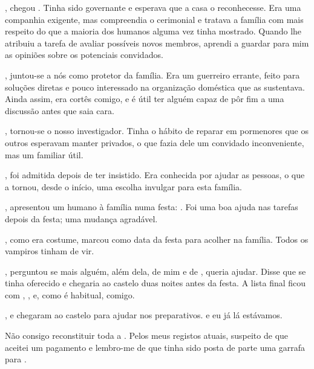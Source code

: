 {, chegou . Tinha sido governante e esperava que a casa o reconhecesse. Era uma companhia exigente, mas compreendia o cerimonial e tratava a família com mais respeito do que a maioria dos humanos alguma vez tinha mostrado. Quando  lhe atribuiu a tarefa de avaliar possíveis novos membros, aprendi a guardar para mim as opiniões sobre os potenciais convidados.

,  juntou-se a nós como protetor da família. Era um guerreiro errante, feito para soluções diretas e pouco interessado na organização doméstica que as sustentava. Ainda assim, era cortês comigo, e é útil ter alguém capaz de pôr fim a uma discussão antes que saia cara.

,  tornou-se o nosso investigador. Tinha o hábito de reparar em pormenores que os outros esperavam manter privados, o que fazia dele um convidado inconveniente, mas um familiar útil.

,  foi admitida depois de  ter insistido. Era conhecida por ajudar as pessoas, o que a tornou, desde o início, uma escolha invulgar para esta família.

,  apresentou um humano à família numa festa: . Foi uma boa ajuda nas tarefas depois da festa; uma mudança agradável.

, como era costume,  marcou  como data da festa para acolher  na família. Todos os vampiros tinham de vir.

,  perguntou se mais alguém, além dela, de mim e de , queria ajudar. Disse que  se tinha oferecido e chegaria ao castelo duas noites antes da festa. A lista final ficou com , ,  e, como é habitual, comigo.

,  e  chegaram ao castelo para ajudar nos preparativos.  e eu já lá estávamos.

Não consigo reconstituir toda a . Pelos meus registos atuais, suspeito de que aceitei um pagamento e lembro-me de que tinha sido posta de parte uma garrafa para .

}
